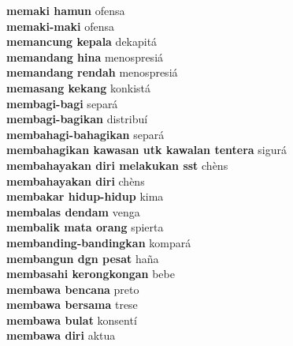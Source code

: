 \textbf{ memaki hamun  } ofensa \\
\textbf{ memaki-maki  } ofensa \\
\textbf{ memancung kepala  } dekapitá \\
\textbf{ memandang hina  } menospresiá \\
\textbf{ memandang rendah  } menospresiá \\
\textbf{ memasang kekang  } konkistá \\
\textbf{ membagi-bagi  } separá \\
\textbf{ membagi-bagikan  } distribuí \\
\textbf{ membahagi-bahagikan  } separá \\
\textbf{ membahagikan kawasan utk kawalan tentera  } sigurá \\
\textbf{ membahayakan diri melakukan sst  } chèns \\
\textbf{ membahayakan diri  } chèns \\
\textbf{ membakar hidup-hidup  } kima \\
\textbf{ membalas dendam  } venga \\
\textbf{ membalik mata orang  } spierta \\
\textbf{ membanding-bandingkan  } kompará \\
\textbf{ membangun dgn pesat  } haña \\
\textbf{ membasahi kerongkongan  } bebe \\
\textbf{ membawa bencana  } preto \\
\textbf{ membawa bersama  } trese \\
\textbf{ membawa bulat  } konsentí \\
\textbf{ membawa diri  } aktua \\
